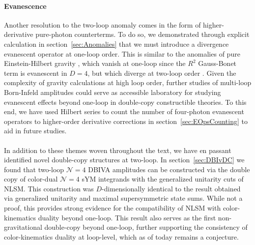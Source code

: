 \documentclass[11pt,letter]{article}
\def\sect#1{section~\ref{#1}}
\begin{document}
\paragraph{\textbf{Evanescence}}Another resolution to the two-loop anomaly comes in the form of higher-derivative pure-photon counterterms. To do so, we demonstrated through explicit calculation in \sect{sec:Anomalies} that we must introduce a divergence evanescent operator at one-loop order. This is similar to the anomalies of pure Einstein-Hilbert gravity \cite{Bern:2015xsa,Bern:2017puu}, which vanish at one-loop since the $R^2$ Gauss-Bonet term is evanescent in $D=4$, but which diverge at two-loop order \cite{Goroff:1985sz,Goroff:1985th,vandeVen:1991gw}. Given the complexity of gravity calculations at high loop order, further studies of multi-loop Born-Infeld amplitudes could serve as accessible laboratory for studying evanescent effects beyond one-loop in double-copy constructible theories. To this end, we have used Hilbert series to count the number of four-photon evanescent operators to higher-order derivative corrections in \sect{sec:EOpsCounting} to aid in future studies. 

\paragraph{} In addition to these themes woven throughout the text, we have {en passant} identified novel double-copy structures at two-loop. In \sect{sec:DBIvDC} we found that two-loop $\mathcal{N}=4$ DBIVA amplitudes can be constructed via the double copy of color-dual $\mathcal{N}=4$ sYM integrands with the generalized unitarity cuts of NLSM. This construction was $D$-dimensionally identical to the result obtained via generalized unitarity and maximal supersymmetric state sums. While not a proof, this provides strong evidence for the compatibility of NLSM with color-kinematics duality beyond one-loop. This result also serves as the first non-gravitational double-copy beyond one-loop, further supporting the consistency of color-kinematics duality at loop-level, which as of today remains a conjecture. 
\end{document}
